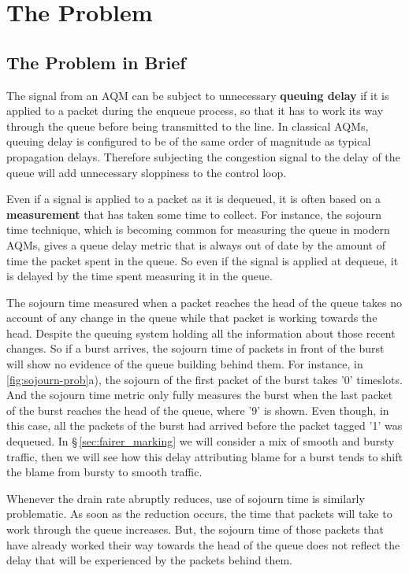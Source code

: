 \section{The Problem}\label{sigqdyntr_problem}
\subsection{The Problem in Brief}\label{sigqdyntr_problem_brief}
The signal from an AQM can be subject to unnecessary \textbf{queuing delay} if it is applied to a packet during the enqueue process, so that it has to work its way through the queue before being transmitted to the line. In classical AQMs, queuing delay is configured to be of the same order of magnitude as typical propagation delays. Therefore subjecting the congestion signal to the delay of the queue will add unnecessary sloppiness to the control loop.

Even if a signal is applied to a packet as it is dequeued, it is often based on a \textbf{measurement} that has taken some time to collect. For instance, the sojourn time technique, which is becoming common for measuring the queue in modern AQMs, gives a queue delay metric that is always out of date by the amount of time the packet spent in the queue. So even if the signal is applied at dequeue, it is delayed by the time spent measuring it in the queue.

The sojourn time measured when a packet reaches the head of the queue takes no account of any change in the queue while that packet is working towards the head. Despite the queuing system holding all the information about those recent changes. So if a burst arrives, the sojourn time of packets in front of the burst will show no evidence of the queue building behind them. For instance, in \autoref{fig:sojourn-prob}a), the sojourn of the first packet of the burst takes '0' timeslots. And the sojourn time metric only fully measures the burst when the last packet of the burst reaches the head of the queue, where '9' is shown. Even though, in this case, all the packets of the burst had arrived before the packet tagged '1' was dequeued. In \S\,\ref{sec:fairer_marking} we will consider a mix of smooth and bursty traffic, then we will see how this delay attributing blame for a burst tends to shift the blame from bursty to smooth traffic.

Whenever the drain rate abruptly reduces, use of sojourn time is similarly problematic. As soon as the reduction occurs, the time that packets will take to work through the queue increases. But, the sojourn time of those packets that have already worked their way towards the head of the queue does not reflect the delay that will be experienced by the packets behind them.

